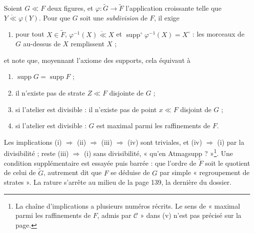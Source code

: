 \documentclass[11pt,a4paper]{article}
\begin{document}
Soient $G \ll F$ deux figures, et $\varphi : \widetilde{G} \to \widetilde{F}$
l'application croissante telle que $Y \mathrel{\mathring{\ll}} \varphi(Y)$. Pour
que $G$ soit une \emph{subdivision} de $F$, il exige
\begin{enumerate}
\item[(i)] pour tout $X \in \widetilde{F}$, $\varphi^{-1}(X)
\mathrel{\mathring{\ll}} X$ et $\operatorname{supp}^{\circ}\varphi^{-1}(X) =
X^{\circ}$ : les morceaux de $G$ au-dessus de $X$ remplissent $X$ ;
\end{enumerate}
et note que, moyennant l'axiome des supports, cela équivaut à
\begin{enumerate}
\item[(ii)] $\operatorname{supp}G = \operatorname{supp}F$ ;
\item[(iii)] il n'existe pas de strate $Z \ll F$ disjointe de $G$ ;
\item[(iv)] si l'atelier est divisible : il n'existe pas de point $x \ll F$
disjoint de $G$ ;
\item[(v)] si l'atelier est divisible : $G$ est maximal parmi les raffinements de
$F$.
\end{enumerate}
Les implications (i) $\Rightarrow$ (ii) $\Rightarrow$ (iii) $\Rightarrow$ (iv)
sont triviales, et (iv) $\Rightarrow$ (i) par la divisibilité ; reste (iii)
$\Rightarrow$ (i) sans divisibilité, « qu'en Atmagsupp ? »\footnote{La chaîne
d'implications a plusieurs numéros récrits. Le sens de « maximal parmi les
raffinements de $F$, admis par $\mathcal{C}$ » dans (v) n'est pas précisé sur la
page.}. Une condition supplémentaire est essayée puis barrée : que l'ordre de
$\widetilde{F}$ soit le quotient de celui de $\widetilde{G}$, autrement dit que $F$ se
déduise de $G$ par simple « regroupement de strates ». La rature s'arrête au
milieu de la page 139, la dernière du dossier.
\end{document}
